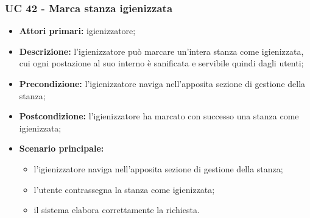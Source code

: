 \subsubsection{UC 42 - Marca stanza igienizzata}

\begin{itemize}
\item \textbf{Attori primari:} igienizzatore;
\item \textbf{Descrizione:} l’igienizzatore può marcare un'intera stanza come igienizzata, cui ogni postazione al suo interno è sanificata e servibile quindi dagli utenti;
\item \textbf{Precondizione:} l'igienizzatore naviga nell’apposita sezione di gestione della stanza; 
\item \textbf{Postcondizione:} l'igienizzatore ha marcato con successo una stanza come igienizzata;
\item \textbf{Scenario principale:} 
	\begin{itemize}
		\item l'igienizzatore naviga nell’apposita sezione di gestione della stanza;	
		\item l'utente contrassegna la stanza come igienizzata;
		\item il sistema elabora correttamente la richiesta.
		\end{itemize}
\end{itemize}


